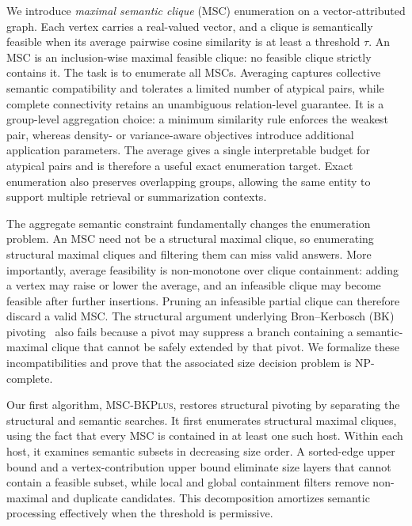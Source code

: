 \documentclass[sigconf, nonacm]{acmart}
\newcommand{\subEnum}{MSC-\textsc{BKPlus}}
\begin{document}
We introduce \emph{maximal semantic clique} (MSC) enumeration on a
vector-attributed graph. Each vertex carries a real-valued vector, and a clique
is semantically feasible when its average pairwise cosine similarity is at
least a threshold $\tau$. An MSC is an inclusion-wise maximal feasible clique:
no feasible clique strictly contains it. The task is to enumerate all MSCs.
Averaging captures collective semantic compatibility and tolerates a limited
number of atypical pairs, while complete connectivity retains an unambiguous
relation-level guarantee. It is a group-level aggregation choice: a minimum
similarity rule enforces the weakest pair, whereas density- or variance-aware
objectives introduce additional application parameters. The average gives a
single interpretable budget for atypical pairs and is therefore a useful exact
enumeration target. Exact enumeration also preserves overlapping groups,
allowing the same entity to support multiple retrieval or summarization
contexts.

The aggregate semantic constraint fundamentally changes the enumeration
problem. An MSC need not be a structural maximal clique, so enumerating
structural maximal cliques and filtering them can miss valid answers. More
importantly, average feasibility is non-monotone over clique containment:
adding a vertex may raise or lower the average, and an infeasible clique may
become feasible after further insertions. Pruning an infeasible partial clique
can therefore discard a valid MSC. The structural argument underlying
Bron--Kerbosch (BK) pivoting~\cite{bron1973} also fails because a pivot may
suppress a branch containing a semantic-maximal clique that cannot be safely
extended by that pivot. We formalize these incompatibilities and prove that the
associated size decision problem is NP-complete.

Our first algorithm, \subEnum, restores structural pivoting by separating the
structural and semantic searches. It first enumerates structural maximal
cliques, using the fact that every MSC is contained in at least one such host.
Within each host, it examines semantic subsets in decreasing size order. A
sorted-edge upper bound and a vertex-contribution upper bound eliminate size
layers that cannot contain a feasible subset, while local and global
containment filters remove non-maximal and duplicate candidates. This
decomposition amortizes semantic processing effectively when the threshold is
permissive.
\end{document}
